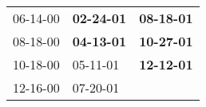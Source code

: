 \begin{supertabular}{p{0.33\columnwidth}p{0.33\columnwidth}p{0.33\columnwidth}}
 06-14-00\textsuperscript{} &  \textbf{02-24-01\textsuperscript{}} &  \textbf{08-18-01\textsuperscript{}} \\
 08-18-00\textsuperscript{} &  \textbf{04-13-01\textsuperscript{}} &  \textbf{10-27-01\textsuperscript{}} \\
 10-18-00\textsuperscript{} &           05-11-01\textsuperscript{} &  \textbf{12-12-01\textsuperscript{}} \\
 12-16-00\textsuperscript{} &           07-20-01\textsuperscript{} &                                      \\
\end{supertabular}

